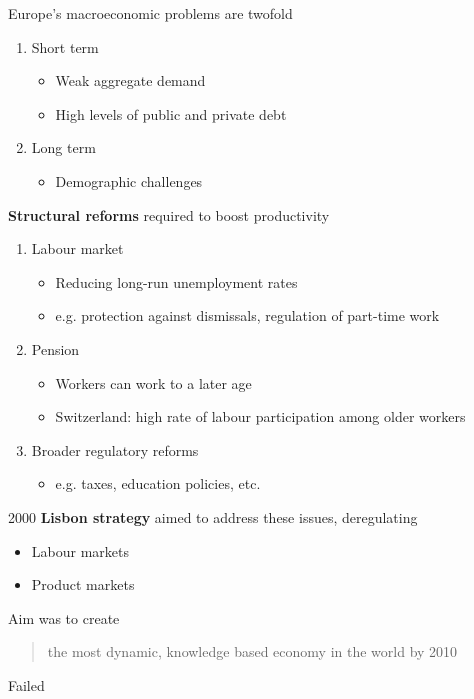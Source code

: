 \documentclass{beamer}
\begin{document}
\begin{frame}
 Europe's macroeconomic problems are twofold  
\begin{enumerate}
  \item Short term
  \begin{itemize}
    \item Weak aggregate demand
    \item High levels of public and private debt
  \end{itemize}
  \medskip
  \item Long term
  \begin{itemize}
    \item Demographic challenges  
  \end{itemize}    
\end{enumerate}
\end{frame}

\begin{frame}
  \textbf{Structural reforms} required to boost productivity
  \begin{enumerate}
  \item Labour market
  \begin{itemize}
    \item Reducing long-run unemployment rates
    \item e.g. protection against dismissals, regulation of part-time work
  \end{itemize}
  \item Pension
  \begin{itemize}
    \item Workers can work to a later age
    \item Switzerland: high rate of labour participation among older workers
  \end{itemize}
  \item Broader regulatory reforms
  \begin{itemize}
    \item e.g. taxes, education policies, etc. 
  \end{itemize}
\end{enumerate}
\end{frame}

\begin{frame}
  2000 \textbf{Lisbon strategy} aimed to address these issues, deregulating 
  \begin{itemize}
    \item Labour markets
    \item Product markets
  \end{itemize}
  \medskip
  Aim was to create
  \begin{quote}
    the most dynamic, knowledge based economy in the world by 2010  
  \end{quote}
  \medskip
  Failed  
\end{frame}
\end{document}
